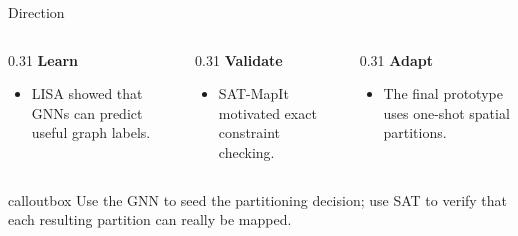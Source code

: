 \documentclass[aspectratio=169,10pt]{beamer}
\newcommand{\smallcaps}[1]{{\footnotesize\bfseries\color{muted}#1}}
\newcommand{\callout}[1]{%
  \begin{beamercolorbox}[rounded=true,wd=\linewidth,sep=0.8ex]{calloutbox}
  #1
  \end{beamercolorbox}}
\begin{document}
\begin{frame}{Direction}
  \begin{columns}[T,totalwidth=\linewidth]
    \begin{column}{0.31\linewidth}
      \smallcaps{Learn}
      \vspace{0.2cm}
      \begin{itemize}
        \item LISA showed that GNNs can predict useful graph labels.
      \end{itemize}
    \end{column}
    \begin{column}{0.31\linewidth}
      \smallcaps{Validate}
      \vspace{0.2cm}
      \begin{itemize}
        \item SAT-MapIt motivated exact constraint checking.
      \end{itemize}
    \end{column}
    \begin{column}{0.31\linewidth}
      \smallcaps{Adapt}
      \vspace{0.2cm}
      \begin{itemize}
        \item The final prototype uses one-shot spatial partitions.
      \end{itemize}
    \end{column}
  \end{columns}

  \vspace{0.65cm}
  \callout{Use the GNN to seed the partitioning decision; use SAT to verify that each resulting partition can really be mapped.}

\end{frame}
\end{document}
